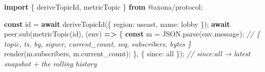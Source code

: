 \documentclass[
  nobib]{tufte-handout}
\newenvironment{Shaded}{}{}
\newcommand{\AttributeTok}[1]{\textcolor[rgb]{0.49,0.56,0.16}{#1}}
\newcommand{\BuiltInTok}[1]{\textcolor[rgb]{0.00,0.50,0.00}{#1}}
\newcommand{\CommentTok}[1]{\textcolor[rgb]{0.38,0.63,0.69}{\textit{#1}}}
\newcommand{\ControlFlowTok}[1]{\textcolor[rgb]{0.00,0.44,0.13}{\textbf{#1}}}
\newcommand{\DataTypeTok}[1]{\textcolor[rgb]{0.56,0.13,0.00}{#1}}
\newcommand{\FunctionTok}[1]{\textcolor[rgb]{0.02,0.16,0.49}{#1}}
\newcommand{\ImportTok}[1]{\textcolor[rgb]{0.00,0.50,0.00}{\textbf{#1}}}
\newcommand{\KeywordTok}[1]{\textcolor[rgb]{0.00,0.44,0.13}{\textbf{#1}}}
\newcommand{\NormalTok}[1]{#1}
\newcommand{\OperatorTok}[1]{\textcolor[rgb]{0.40,0.40,0.40}{#1}}
\newcommand{\StringTok}[1]{\textcolor[rgb]{0.25,0.44,0.63}{#1}}
\begin{document}
\begin{Shaded}
\begin{Highlighting}[]
\ImportTok{import}\NormalTok{ \{ deriveTopicId}\OperatorTok{,}\NormalTok{ metricTopic \} }\ImportTok{from} \StringTok{\textquotesingle{}@axona/protocol\textquotesingle{}}\OperatorTok{;}

\KeywordTok{const}\NormalTok{ id }\OperatorTok{=} \ControlFlowTok{await} \FunctionTok{deriveTopicId}\NormalTok{(\{ }\DataTypeTok{region}\OperatorTok{:} \StringTok{\textquotesingle{}useast\textquotesingle{}}\OperatorTok{,} \DataTypeTok{name}\OperatorTok{:} \StringTok{\textquotesingle{}lobby\textquotesingle{}}\NormalTok{ \})}\OperatorTok{;}
\ControlFlowTok{await}\NormalTok{ peer}\OperatorTok{.}\FunctionTok{sub}\NormalTok{(}\FunctionTok{metricTopic}\NormalTok{(id)}\OperatorTok{,}\NormalTok{ (env) }\KeywordTok{=\textgreater{}}\NormalTok{ \{}
  \KeywordTok{const}\NormalTok{ m }\OperatorTok{=} \BuiltInTok{JSON}\OperatorTok{.}\FunctionTok{parse}\NormalTok{(env}\OperatorTok{.}\AttributeTok{message}\NormalTok{)}\OperatorTok{;}
  \CommentTok{// \{ topic, ts, by, signer, current\_count, seq, subscribers, bytes \}}
  \FunctionTok{render}\NormalTok{(m}\OperatorTok{.}\AttributeTok{subscribers}\OperatorTok{,}\NormalTok{ m}\OperatorTok{.}\AttributeTok{current\_count}\NormalTok{)}\OperatorTok{;}
\NormalTok{\}}\OperatorTok{,}\NormalTok{ \{ }\DataTypeTok{since}\OperatorTok{:} \StringTok{\textquotesingle{}all\textquotesingle{}}\NormalTok{ \})}\OperatorTok{;}   \CommentTok{// since:\textquotesingle{}all\textquotesingle{} → latest snapshot + the rolling history}
\end{Highlighting}
\end{Shaded}
\end{document}
